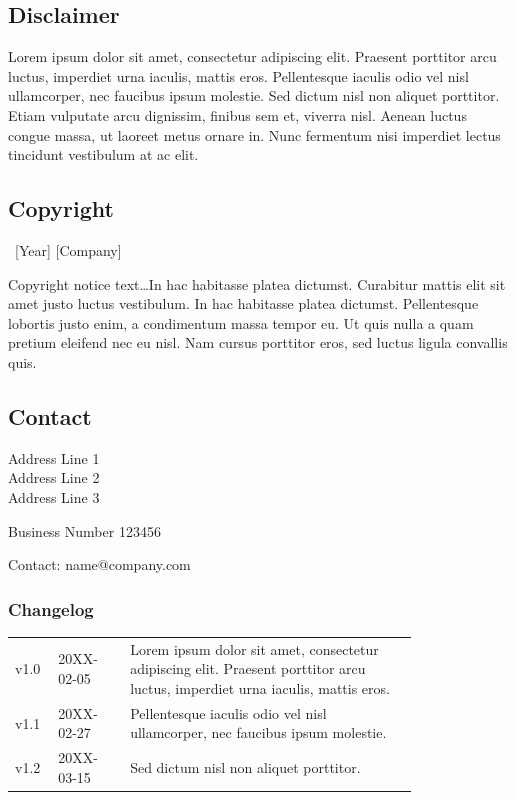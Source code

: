 \documentclass[
	a4paper, %
	12pt, %
]{include/CSSullivanBusinessReport}
\begin{document}
\begin{twothirdswidth} %
	\footnotesize %
	
	\subsection*{Disclaimer}

	Lorem ipsum dolor sit amet, consectetur adipiscing elit. Praesent porttitor arcu luctus, imperdiet urna iaculis, mattis eros. Pellentesque iaculis odio vel nisl ullamcorper, nec faucibus ipsum molestie. Sed dictum nisl non aliquet porttitor. Etiam vulputate arcu dignissim, finibus sem et, viverra nisl. Aenean luctus congue massa, ut laoreet metus ornare in. Nunc fermentum nisi imperdiet lectus tincidunt vestibulum at ac elit.
	
	\subsection*{Copyright}
	
	\textcopyright~[Year] [Company] 
	
	Copyright notice text\ldots In hac habitasse platea dictumst. Curabitur mattis elit sit amet justo luctus vestibulum. In hac habitasse platea dictumst. Pellentesque lobortis justo enim, a condimentum massa tempor eu. Ut quis nulla a quam pretium eleifend nec eu nisl. Nam cursus porttitor eros, sed luctus ligula convallis quis.
	
	\subsection*{Contact}
	
	Address Line 1\\
	Address Line 2\\
	Address Line 3
	
	Business Number 123456
	
	Contact: name@company.com
	
	\vfill %
	
	\subsubsection*{Changelog}
	
	\scriptsize %
	
	\begin{tabular}{@{} L{0.05\linewidth} L{0.15\linewidth} L{0.6\linewidth} @{}} %
		\toprule
		v1.0 & 20XX-02-05 & Lorem ipsum dolor sit amet, consectetur adipiscing elit. Praesent porttitor arcu luctus, imperdiet urna iaculis, mattis eros.\\
		v1.1 & 20XX-02-27 & Pellentesque iaculis odio vel nisl ullamcorper, nec faucibus ipsum molestie.\\
		v1.2 & 20XX-03-15 & Sed dictum nisl non aliquet porttitor.\\
		\bottomrule
	\end{tabular}
\end{twothirdswidth}
\end{document}
